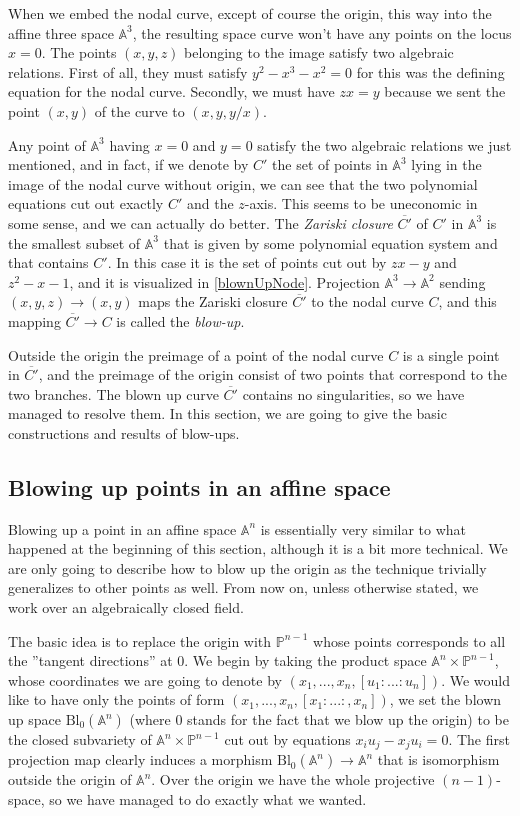 \documentclass[12pt,a4paper,leqno]{article}
\newcommand{\Aff}{\mathbb{A}}
\newcommand{\Proj}{\mathbb{P}}
\newcommand{\bl}{\mathrm{Bl}}
\newcommand{\fref}[1]{\hyperref[{#1}]{\ref*{#1}}}
\theoremstyle{plain}
\theoremstyle{definition}
\theoremstyle{remark}
\begin{document}
When we embed the nodal curve, except of course the origin, this way into the affine three space $\Aff^3$, the resulting space curve won't have any points on the locus $x=0$. The points $(x,y,z)$ belonging to the image satisfy two algebraic relations. First of all, they must satisfy $y^2 - x^3 - x^2 = 0$ for this was the defining equation for the nodal curve. Secondly, we must have $zx = y$ because we sent the point $(x,y)$ of the curve to $(x,y,y/x)$.

Any point of $\Aff^3$ having $x=0$ and $y=0$ satisfy the two algebraic relations we just mentioned, and in fact, if we denote by $C'$ the set of points in $\Aff^3$ lying in the image of the nodal curve without origin, we can see that the two polynomial equations cut out exactly $C'$ and the $z$-axis. This seems to be uneconomic in some sense, and we can actually do better. The \emph{Zariski closure} $\overline{C'}$ of $C'$ in $\Aff^3$ is the smallest subset of $\Aff^3$ that is given by some polynomial equation system and that contains $C'$. In this case it is the set of points cut out by $zx - y$ and $z^2 - x - 1$, and it is visualized in \fref{blownUpNode}. Projection $\Aff ^3 \to \Aff^2$ sending $(x,y,z) \to (x,y)$ maps the Zariski closure $\overline{C'}$ to the nodal curve $C$, and this mapping $\overline{C'} \to C$ is called the \emph{blow-up}.

Outside the origin the preimage of a point of the nodal curve $C$ is a single point in $\overline{C'}$, and the preimage of the origin consist of two points that correspond to the two branches. The blown up curve $\overline{C'}$ contains no singularities, so we have managed to resolve them. In this section, we are going to give the basic constructions and results of blow-ups.

\subsection{Blowing up points in an affine space}

Blowing up a point in an affine space $\Aff^n$ is essentially very similar to what happened at the beginning of this section, although it is a bit more technical. We are only going to describe how to blow up the origin as the technique trivially generalizes to other points as well. From now on, unless otherwise stated, we work over an algebraically closed field.

The basic idea is to replace the origin with $\Proj^{n-1}$ whose points corresponds to all the ''tangent directions'' at 0. We begin by taking the product space $\Aff^n \times \Proj^{n-1}$, whose coordinates we are going to denote by $(x_1,...,x_n, [u_1:...:u_n])$. We would like to have only the points of form $(x_1,...,x_n, [x_1:...:,x_n])$, we set the blown up space $\bl_0 (\Aff^n)$ (where 0 stands for the fact that we blow up the origin) to be the closed subvariety of $\Aff^n \times \Proj^{n-1}$ cut out by equations $x_i u_j - x_j u_i = 0$. The first projection map clearly induces a morphism $\bl_0 (\Aff^n) \to \Aff^n$ that is isomorphism outside the origin of $\Aff^n$. Over the origin we have the whole projective $(n-1)$-space, so we have managed to do exactly what we wanted.
\end{document}
